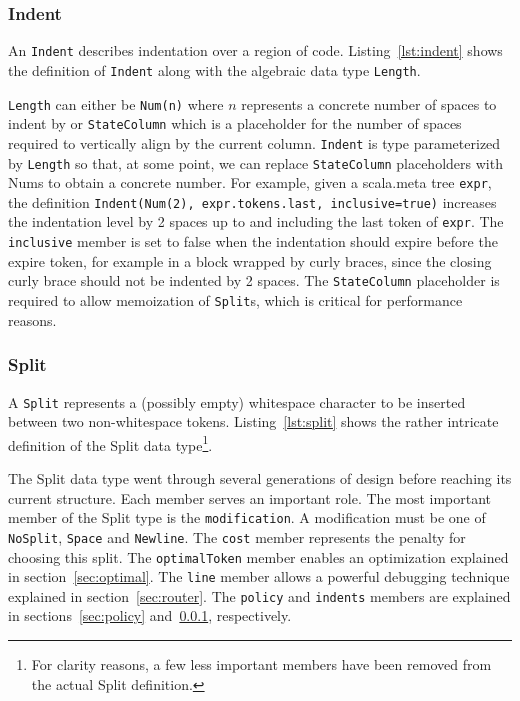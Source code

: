 \subsubsection{Indent}\label{sec:indent}
An \texttt{Indent} describes indentation over a region of code.
Listing~\ref{lst:indent} shows the definition of \texttt{Indent} along with the algebraic data type \texttt{Length}.
\begin{minipage}{\linewidth}

\end{minipage}
\texttt{Length} can either be \texttt{Num(n)} where $n$ represents a concrete number of spaces to indent by or \texttt{StateColumn} which is a placeholder for the number of spaces required to vertically align by the current column.
\texttt{Indent} is type parameterized by \texttt{Length} so that, at some point, we can replace \texttt{StateColumn} placeholders with Nums to obtain a concrete number.
For example, given a scala.meta tree \texttt{expr}, the definition \texttt{Indent(Num(2), expr.tokens.last, inclusive=true)}
increases the indentation level by 2 spaces up to and including the last token of \texttt{expr}.
The \texttt{inclusive} member is set to false when the indentation should expire before the expire token, for example in a block wrapped by curly braces, since the closing curly brace should not be indented by 2 spaces.
The \texttt{StateColumn} placeholder is required to allow memoization of \texttt{Split}s, which is critical for performance reasons.

\subsubsection{Split}
A \texttt{Split} represents a (possibly empty) whitespace character to be inserted between two non-whitespace tokens.
Listing~\ref{lst:split} shows the rather intricate definition of the Split data type\footnote{
  For clarity reasons, a few less important members have been removed from the actual Split definition.}.
\begin{minipage}{\linewidth}
  
\end{minipage}
The Split data type went through several generations of design before reaching its current structure.
Each member serves an important role.
The most important member of the Split type is the \texttt{modification}.
A modification must be one of \texttt{NoSplit}, \texttt{Space} and \texttt{Newline}.
The \texttt{cost} member represents the penalty for choosing this split.
The \texttt{optimalToken} member enables an optimization explained in section~\ref{sec:optimal}.
The \texttt{line} member allows a powerful debugging technique explained in section~\ref{sec:router}.
The \texttt{policy} and \texttt{indents} members are explained in sections~\ref{sec:policy} and~\ref{sec:indent}, respectively.

